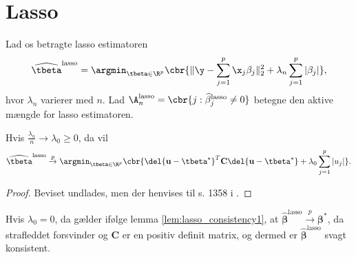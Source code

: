 \section{Lasso}
Lad os betragte lasso estimatoren
\begin{align*}
\widehat{\tbeta}^\text{lasso} = \argmin_{\tbeta \in \R^p} \cbr{ \Vert \y - \sum_{j=1}^p \x_j \beta_j \Vert_2^2 + \lambda_n \sum_{j=1}^p \vert \beta_j \vert},
\end{align*}
hvor \(\lambda_n\) varierer med \(n\).
Lad \(\A_n^\text{lasso} = \cbr{j : \widehat{\beta}_j^\text{lasso} \neq 0}\) betegne den aktive mængde for lasso estimatoren.

\begin{lem}\label{lem:lasso_consistency1}
Hvis $\frac{\lambda_n}{n} \rightarrow \lambda_0 \geq 0$, da vil
\begin{align*}
\widehat{\tbeta}^\text{lasso} \overset{p}{\rightarrow} \argmin_{\tbeta \in \R^p} \cbr{ \del{\mathbf{u} - \tbeta^*}^T \mathbf{C} \del{\mathbf{u} - \tbeta^*} + \lambda_0 \sum_{j=1}^p \vert u_j \vert}.
\end{align*}
\end{lem}
\begin{proof}
Beviset undlades, men der henvises til s. 1358 i \citep{adaptive_lasso_knight}.
\end{proof}
Hvis $\lambda_0=0$, da gælder ifølge lemma \ref{lem:lasso_consistency1}, at $\widehat{\boldsymbol{\beta}}^\text{lasso} \overset{p}{\rightarrow} \boldsymbol{\beta}^{*}$, da strafleddet forsvinder og $\mathbf{C}$ er en positiv definit matrix, og dermed er $\widehat{\boldsymbol{\beta}}^\text{lasso}$ svagt konsistent. 


